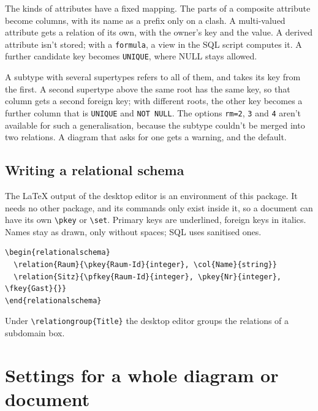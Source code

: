 \documentclass[10pt,a4paper]{article}
\newcommand\cs[1]{\texttt{\textbackslash#1}}
\begin{document}
The kinds of attributes have a fixed mapping. The parts of a composite attribute become
columns, with its name as a prefix only on a clash. A multi-valued attribute gets a relation of
its own, with the owner's key and the value. A derived attribute isn't stored; with a
\texttt{formula}, a view in the SQL script computes it. A further candidate key becomes
\texttt{UNIQUE}, where NULL stays allowed.

A subtype with several supertypes refers to all of them, and takes its key from the first.
A second supertype above the same root has the same key, so that column gets a second foreign
key; with different roots, the other key becomes a further column that is \texttt{UNIQUE} and
\texttt{NOT NULL}. The options \texttt{rm=2}, \texttt{3} and \texttt{4} aren't available for
such a generalisation, because the subtype couldn't be merged into two relations. A diagram
that asks for one gets a warning, and the default.

\subsection{Writing a relational schema}

The LaTeX output of the desktop editor is an environment of this package. It needs no other
package, and its commands only exist inside it, so a document can have its own
\cs{pkey} or \cs{set}. Primary keys are underlined, foreign keys in italics. Names stay
as drawn, only without spaces; SQL uses sanitised ones.

\begin{verbatim}
\begin{relationalschema}
  \relation{Raum}{\pkey{Raum-Id}{integer}, \col{Name}{string}}
  \relation{Sitz}{\pfkey{Raum-Id}{integer}, \pkey{Nr}{integer}, \fkey{Gast}{}}
\end{relationalschema}
\end{verbatim}
\begin{relationalschema}
\end{relationalschema}

\noindent Under \cs{relationgroup}\verb|{Title}| the desktop editor groups the relations of a
subdomain box.

\section{Settings for a whole diagram or document}\label{sec:settings}
\end{document}
